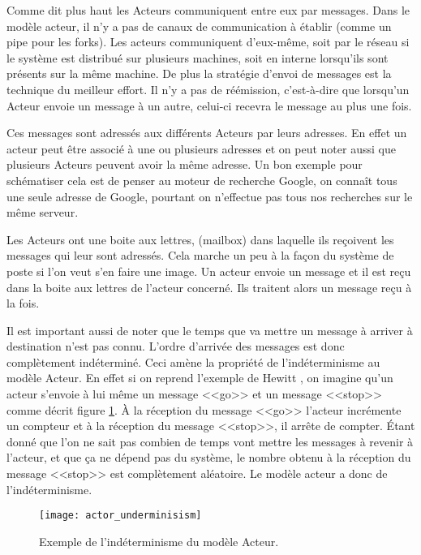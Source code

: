 \documentclass[11pt, a4paper]{article}
\begin{document}
Comme dit plus haut les Acteurs communiquent entre eux par messages. Dans le modèle acteur, il n'y a pas de canaux de communication à établir (comme un pipe pour les forks). Les acteurs communiquent d'eux-même, soit par le réseau si le système est distribué sur plusieurs machines, soit en interne lorsqu'ils sont présents sur la même machine. De plus la stratégie d'envoi de messages est la technique du meilleur effort. Il n'y a pas de réémission, c'est-à-dire que lorsqu'un Acteur envoie un message à un autre, celui-ci recevra le message au plus une fois. 
\par Ces messages sont adressés aux différents Acteurs par leurs adresses. En effet un acteur peut être associé à une ou plusieurs adresses et on peut noter aussi que plusieurs Acteurs peuvent avoir la même adresse. Un bon exemple pour schématiser cela est de penser au moteur de recherche Google, on connaît tous une seule adresse de Google, pourtant on n'effectue pas tous nos recherches sur le même serveur.
\par Les Acteurs ont une boite aux lettres, (mailbox) dans laquelle ils reçoivent les messages qui leur sont adressés. Cela marche un peu à la façon du système de poste si l'on veut s'en faire une image. Un acteur envoie un message et il est reçu dans la boite aux lettres de l'acteur concerné. Ils traitent alors un message reçu à la fois.
\par Il est important aussi de noter que le temps que va mettre un message à arriver à destination n'est pas connu. L'ordre d'arrivée des messages est donc complètement indéterminé. Ceci amène la propriété de l'indéterminisme au modèle Acteur. En effet si on reprend l'exemple de Hewitt \cite{video_hewitt}, on imagine qu'un acteur s'envoie à lui même un message <<go>> et un message <<stop>> comme décrit figure \ref{fig1}. À la réception du message <<go>> l'acteur incrémente un compteur et à la réception du message <<stop>>, il arrête de compter. Étant donné que l'on ne sait pas combien de temps vont mettre les messages à revenir à l'acteur, et que ça ne dépend pas du système, le nombre obtenu à la réception du message <<stop>> est complètement aléatoire. Le modèle acteur a donc de l'indéterminisme.

\begin{figure}
\center
\texttt{[image: actor\_underminisism]}
\caption{Exemple de l'indéterminisme du modèle Acteur.}
\label{fig1}
\end{figure}
\end{document}
